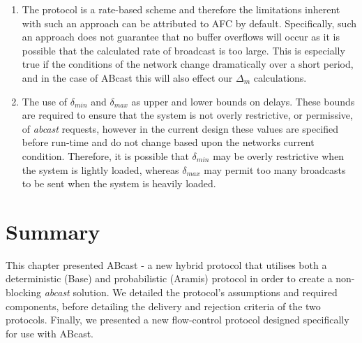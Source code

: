     \begin{enumerate}[label=\roman*]
        \item    The protocol is a rate-based scheme and therefore the limitations inherent with such an approach can be attributed to AFC by default.  Specifically, such an approach does not guarantee that no buffer overflows will occur as it is possible that the calculated rate of broadcast is too large.  This is especially true if the conditions of the network change dramatically over a short period, and in the case of \textsf{ABcast} this will also effect our $\Delta_m$ calculations.  
        
        \item    The use of $\delta_{min}$ and $\delta_{max}$ as upper and lower bounds on delays.  These bounds are required to ensure that the system is not overly restrictive, or permissive, of \emph{abcast} requests, however in the current design these values are specified before run-time and do not change based upon the networks current condition.  Therefore, it is possible that $\delta_{min}$ may be overly restrictive when the system is lightly loaded, whereas $\delta_{max}$ may permit too many broadcasts to be sent when the system is heavily loaded.  
    \end{enumerate}

\section{Summary}
This chapter presented \textsf{ABcast} - a new hybrid protocol that utilises both a deterministic (\textsf{Base}) and probabilistic (\textsf{Aramis}) protocol in order to create a non-blocking \emph{abcast} solution.  We detailed the protocol's assumptions and required components, before detailing the delivery and rejection criteria of the two protocols.  Finally, we presented a new flow-control protocol designed specifically for use with \textsf{ABcast}.  